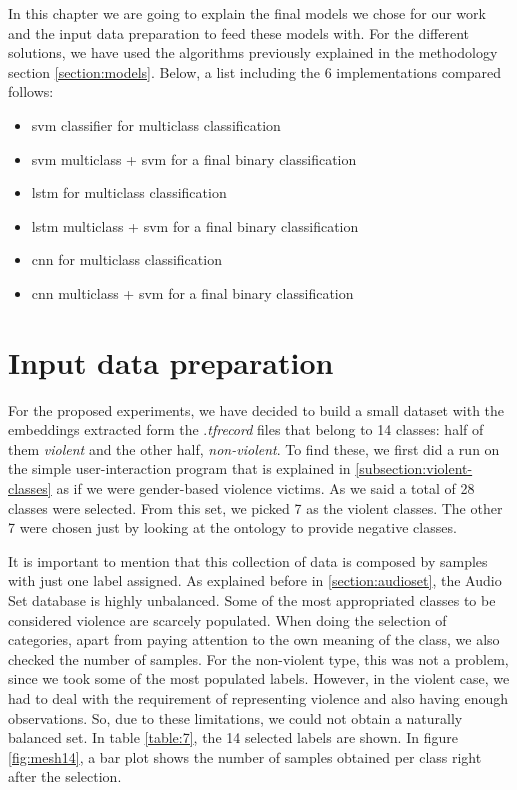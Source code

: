 \label{chapter:experiments}

	In this chapter we are going to explain the final models we chose for our work and the input data preparation to feed these models with. For the different solutions, we have used the algorithms previously explained in the methodology section \ref{section:models}. Below, a list including the 6 implementations compared follows:
	
	\begin{itemize}
		\item \acrshort{svm} classifier for multiclass classification
		\item \acrshort{svm} multiclass + \acrshort{svm} for a final binary classification
		\item \acrshort{lstm} for multiclass classification
		\item \acrshort{lstm} multiclass + \acrshort{svm} for a final binary classification
		\item \acrshort{cnn} for multiclass classification
		\item \acrshort{cnn} multiclass + \acrshort{svm} for a final binary classification
	\end{itemize}
	

\section{Input data preparation}
\label{section:input-data-preparation}

	For the proposed experiments, we have decided to build a small dataset with the embeddings extracted form the .\textit{tfrecord} files that belong to 14 classes: half of them \textit{violent} and the other half, \textit{non-violent}. To find these, we first did a run on the simple user-interaction program that is explained in \ref{subsection:violent-classes} as if we were gender-based violence victims. As we said a total of 28 classes were selected. From this set, we picked 7 as the violent classes. The other 7 were chosen just by looking at the ontology to provide negative classes.
	
	It is important to mention that this collection of data is composed by samples with just one label assigned. As explained before in \ref{section:audioset}, the Audio Set database is highly unbalanced. Some of the most appropriated classes to be considered violence are scarcely populated. When doing the selection of categories, apart from paying attention to the own meaning of the class, we also checked the number of samples. For the non-violent type, this was not a problem, since we took some of the most populated labels. However, in the violent case, we had to deal with the requirement of representing violence and also having enough observations. So, due to these limitations, we could not obtain a naturally balanced set. In table \ref{table:7}, the 14 selected labels are shown. %
	In figure \ref{fig:mesh14}, a bar plot shows the number of samples obtained per class right after the selection. 
	
